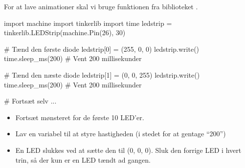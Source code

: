 \documentclass{ucph-handout}
\begin{document}
\begin{exercisebox}[adjusted title=Animationer]
\vspace{-1mm}
For at lave animationer skal vi bruge funktionen  fra
biblioteket .
\vspace{-1mm}
\begin{python}
import machine
import tinkerlib
import time
ledstrip = tinkerlib.LEDStrip(machine.Pin(26), 30)

# Tænd den første diode
ledstrip[0] = (255, 0, 0)
ledstrip.write()
time.sleep_ms(200) # Vent 200 millisekunder

# Tænd den næste diode
ledstrip[1] = (0, 0, 255)
ledstrip.write()
time.sleep_ms(200) # Vent 200 millisekunder

# Fortsæt selv ...
\end{python}
\vspace{-3mm}
\vspace{-4mm}
\begin{itemize}
\item Fortsæt mønsteret for de første 10 LED'er.
\item Lav en variabel til at styre hastigheden (i stedet for at gentage "`200"')
\item En LED slukkes ved at sætte den til (0, 0, 0). Sluk den forrige
  LED i hvert trin, så der kun er en LED tændt ad gangen.
\end{itemize}
  \vspace{-5mm}
\end{exercisebox}
\end{document}
